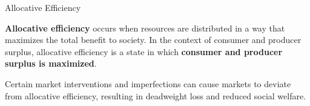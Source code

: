 \documentclass[10pt]{article}
\begin{document}
    \begin{core}{Allocative Efficiency}

      \textbf{Allocative efficiency} occurs when resources are distributed in a way that maximizes the total benefit to society. In the context of consumer and producer surplus, allocative efficiency is a state in which \textbf{consumer and producer surplus is maximized}.


    \end{core}

    Certain market interventions and imperfections can cause markets to deviate from allocative efficiency, resulting in deadweight loss and reduced social welfare.
\end{document}
